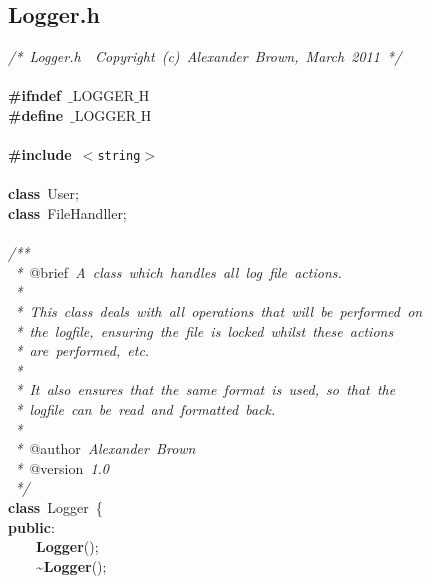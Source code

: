 \subsection{Logger.h}
\scriptsize
\sffamily
\noindent
\mbox{}\textit{/*\ Logger.h\ \ Copyright\ (c)\ Alexander\ Brown,\ March\ 2011\ */} \\
\mbox{} \\
\mbox{}\textbf{\#ifndef}\ $\_$LOGGER$\_$H \\
\mbox{}\textbf{\#define}\ $\_$LOGGER$\_$H \\
\mbox{} \\
\mbox{}\textbf{\#include}\ \texttt{$<$string$>$} \\
\mbox{} \\
\mbox{}\textbf{class}\ User; \\
\mbox{}\textbf{class}\ FileHandller; \\
\mbox{} \\
\mbox{}\textit{/**} \\
\mbox{}\textit{\ *\ }@brief\textit{\ A\ class\ which\ handles\ all\ log\ file\ actions.} \\
\mbox{}\textit{\ *} \\
\mbox{}\textit{\ *\ This\ class\ deals\ with\ all\ operations\ that\ will\ be\ performed\ on} \\
\mbox{}\textit{\ *\ the\ logfile,\ ensuring\ the\ file\ is\ locked\ whilst\ these\ actions} \\
\mbox{}\textit{\ *\ are\ performed,\ etc.} \\
\mbox{}\textit{\ *} \\
\mbox{}\textit{\ *\ It\ also\ ensures\ that\ the\ same\ format\ is\ used,\ so\ that\ the} \\
\mbox{}\textit{\ *\ logfile\ can\ be\ read\ and\ formatted\ back.} \\
\mbox{}\textit{\ *} \\
\mbox{}\textit{\ *\ }@author\textit{\ Alexander\ Brown} \\
\mbox{}\textit{\ *\ }@version\textit{\ 1.0} \\
\mbox{}\textit{\ */} \\
\mbox{}\textbf{class}\ Logger\ \{ \\
\mbox{}\textbf{public}: \\
\mbox{}\ \ \ \ \textbf{Logger}(); \\
\mbox{}\ \ \ \ \textasciitilde{}\textbf{Logger}(); \\
